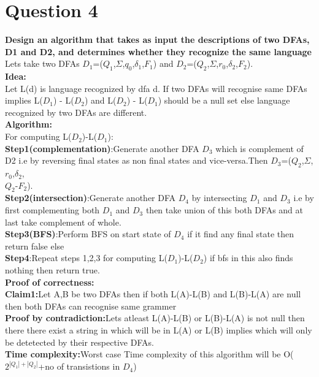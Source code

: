 \documentclass{article}
\begin{document}
\pagebreak
\section{Question 4}
\textbf{Design an algorithm that takes as input the descriptions of two DFAs, D1 and D2, and
determines whether they recognize the same language}\\

Lets take two DFAs $D_1$=($Q_1$,$\Sigma$,$q_0$,$\delta_1$,$F_1$) and $D_2$=($Q_2$,$\Sigma$,$r_0$,$\delta_2$,$F_2$).\\
\textbf{Idea:}\\
Let L(d) is language recognized by dfa d.
If two DFAs will recognise same DFAs implies L($D_1$) - L($D_2$) and L($D_2$) - L($D_1$) should be a null set else language recognized by two DFAs are different.\\
\textbf{Algorithm:}\\
For computing L($D_2$)-L($D_1$):\\
\textbf{Step1(complementation)}:Generate another DFA $D_3$ which is complement of D2 i.e by reversing final states as non final states and vice-versa.Then $D_3$=($Q_2$,$\Sigma$,$r_0$,$\delta_2$,\\$Q_2$-$F_2$).\\
\textbf{Step2(intersection)}:Generate another DFA $D_4$ by intersecting $D_1$ and $D_3$ i.e by first complementing both $D_1$ and $D_3$ then take union of this both DFAs and at last take complement of whole.\\
\textbf{Step3(BFS)}:Perform BFS on start state of $D_4$ if it find any final state then return false else \\
\textbf{Step4}:Repeat steps 1,2,3 for computing L($D_1$)-L($D_2$) if bfs in this also finds nothing then return true.\\
\textbf{Proof of correctness:}\\
\textbf{Claim1:}Let A,B be two DFAs then if both L(A)-L(B) and L(B)-L(A) are null then both DFAs can recognise same grammer\\
\textbf{Proof by contradiction:}Lets atleast L(A)-L(B) or L(B)-L(A) is not null then there there exist a string in which will be in L(A) or L(B) implies which will only be detetected by their respective DFAs.\\
\textbf{Time complexity:}Worst case Time complexity of this algorithm will be O($2^{|Q_1|+|Q_2|}$+no of transistions in $D_4$)
\end{document}
